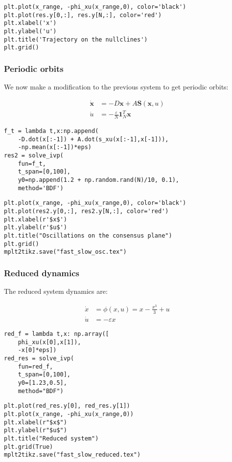 \begin{verbatim}
plt.plot(x_range, -phi_xu(x_range,0), color='black')
plt.plot(res.y[0,:], res.y[N,:], color='red')
plt.xlabel('x')
plt.ylabel('u')
plt.title('Trajectory on the nullclines')
plt.grid()
\end{verbatim}

\hypertarget{periodic-orbits}{%
\subsubsection{Periodic orbits}\label{periodic-orbits}}

We now make a modification to the previous system to get periodic
orbits:

\begin{equation}
\begin{aligned}
\dot{\mathbf{x}} &= -D\mathbf{x} + A\mathbf{S}(\mathbf{x}, u) \\
\dot{u} &= -\frac{\varepsilon}{N} \mathbf{1}_N^T\mathbf{x}
\end{aligned}
\end{equation}

\begin{verbatim}
f_t = lambda t,x:np.append(
    -D.dot(x[:-1]) + A.dot(s_xu(x[:-1],x[-1])),
    -np.mean(x[:-1])*eps)
res2 = solve_ivp(
    fun=f_t,
    t_span=[0,100],
    y0=np.append(1.2 + np.random.rand(N)/10, 0.1),
    method='BDF')
\end{verbatim}

\begin{verbatim}
plt.plot(x_range, -phi_xu(x_range,0), color='black')
plt.plot(res2.y[0,:], res2.y[N,:], color='red')
plt.xlabel(r'$x$')
plt.ylabel(r'$u$')
plt.title("Oscillations on the consensus plane")
plt.grid()
mplt2tikz.save("fast_slow_osc.tex")
\end{verbatim}

\hypertarget{reduced-dynamics}{%
\subsubsection{Reduced dynamics}\label{reduced-dynamics}}

The reduced system dynamics are:

\begin{equation}
\begin{aligned}
\dot{x} &= \phi(x,u) = x - \frac{x^3}{3} + u\\
\dot{u} &= -\varepsilon x
\end{aligned}
\end{equation}

\begin{verbatim}
red_f = lambda t,x: np.array([
    phi_xu(x[0],x[1]),
    -x[0]*eps])
red_res = solve_ivp(
    fun=red_f,
    t_span=[0,100],
    y0=[1.23,0.5],
    method="BDF")
\end{verbatim}

\begin{verbatim}
plt.plot(red_res.y[0], red_res.y[1])
plt.plot(x_range, -phi_xu(x_range,0))
plt.xlabel(r"$x$")
plt.ylabel(r"$u$")
plt.title("Reduced system")
plt.grid(True)
mplt2tikz.save("fast_slow_reduced.tex")
\end{verbatim}


